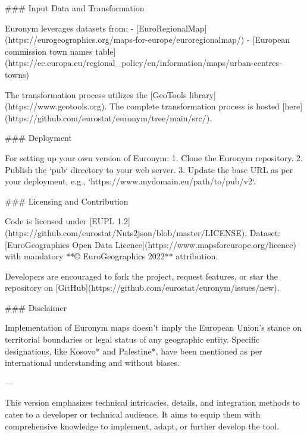 ### Input Data and Transformation

Euronym leverages datasets from:
- [EuroRegionalMap](https://eurogeographics.org/maps-for-europe/euroregionalmap/)
- [European commission town names table](https://ec.europa.eu/regional_policy/en/information/maps/urban-centres-towns)

The transformation process utilizes the [GeoTools library](https://www.geotools.org). The complete transformation process is hosted [here](https://github.com/eurostat/euronym/tree/main/src/).

### Deployment

For setting up your own version of Euronym:
1. Clone the Euronym repository.
2. Publish the `pub` directory to your web server.
3. Update the base URL as per your deployment, e.g., `https://www.mydomain.eu/path/to/pub/v2`.

### Licensing and Contribution

Code is licensed under [EUPL 1.2](https://github.com/eurostat/Nuts2json/blob/master/LICENSE).  
Dataset: [EuroGeographics Open Data Licence](https://www.mapsforeurope.org/licence) with mandatory **© EuroGeographics 2022** attribution.

Developers are encouraged to fork the project, request features, or star the repository on [GitHub](https://github.com/eurostat/euronym/issues/new).

### Disclaimer

Implementation of Euronym maps doesn't imply the European Union's stance on territorial boundaries or legal status of any geographic entity. Specific designations, like Kosovo* and Palestine*, have been mentioned as per international understanding and without biases.

---

This version emphasizes technical intricacies, details, and integration methods to cater to a developer or technical audience. It aims to equip them with comprehensive knowledge to implement, adapt, or further develop the tool.